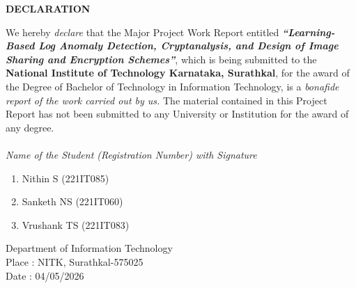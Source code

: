
\begin{framed}
	\begin{center}
		\textbf{{\Large DECLARATION}}\\ 
\vspace{0.3cm}
	\end{center}
	\null
	We hereby \textit{declare} that the Major Project Work Report entitled \textit{\textbf{``Learning-Based Log Anomaly Detection, Cryptanalysis, and Design of Image Sharing and Encryption Schemes''}}, which is being submitted to the \textbf{National Institute of Technology Karnataka, Surathkal}, for the award of the Degree of Bachelor of Technology in Information Technology, is a \textit{bonafide report of the work carried out by us.} The material contained in this Project Report has not been submitted to any University or Institution for the award of any degree.
	\\
	\\
	\textit{Name of the Student (Registration Number) with Signature }
	\begin{enumerate}[label={(\arabic*)}]
		\item  Nithin S (221IT085)\hspace{0.5em} 
		\item  Sanketh NS (221IT060)
        \item  Vrushank TS (221IT083)
  
	\end{enumerate}
	\null
	Department of Information Technology \\
	Place     : NITK, Surathkal-575025 \\
	Date      : 04/05/2026
	\\
	\\
	\\
	\\
	\\
	\\
	\\

\end{framed}